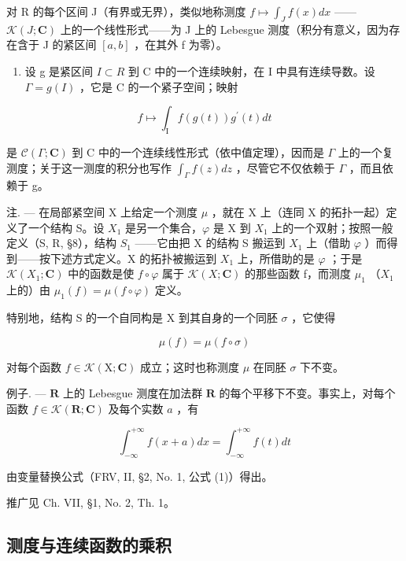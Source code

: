 对 R 的每个区间 J（有界或无界），类似地称测度 \(f \mapsto \int_{J} f(x) dx\) ——\(\mathcal{K}(J; \mathbf{C})\) 上的一个线性形式——为 J 上的 Lebesgue 测度（积分有意义，因为存在含于 J 的紧区间 \([a, b]\) ，在其外 f 为零）。

\begin{enumerate}
\def\labelenumi{\Roman{enumi}.}
\setcounter{enumi}{2}
\tightlist
\item
  设 g 是紧区间 \(I \subset R\) 到 C 中的一个连续映射，在 I 中具有连续导数。设 \(\Gamma = g(I)\) ，它是 C 的一个紧子空间；映射
\end{enumerate}

\[
f \mapsto \int_ {\mathrm{I}} f (g (t)) g ^ {\prime} (t) d t
\]

是 \(\mathcal{C}(\Gamma;\mathbf{C})\) 到 C 中的一个连续线性形式（依中值定理），因而是 \(\Gamma\) 上的一个复测度；关于这一测度的积分也写作 \(\int_{\Gamma} f(z) dz\) ，尽管它不仅依赖于 \(\Gamma\) ，而且依赖于 g。

注. --- 在局部紧空间 X 上给定一个测度 \(\mu\) ，就在 X 上（连同 X 的拓扑一起）定义了一个结构 S。设 \(X_{1}\) 是另一个集合，\(\varphi\) 是 X 到 \(X_{1}\) 上的一个双射；按照一般定义（S, R, §8），结构 \(S_{1}\) ——它由把 X 的结构 S 搬运到 \(X_{1}\) 上（借助 \(\varphi\) ）而得到——按下述方式定义。X 的拓扑被搬运到 \(X_{1}\) 上，所借助的是 \(\varphi\) ；于是 \(\mathcal{K}(X_{1};\mathbf{C})\) 中的函数是使 \(f \circ \varphi\) 属于 \(\mathcal{K}(X;\mathbf{C})\) 的那些函数 f，而测度 \(\mu_{1}\) （\(X_{1}\) 上的）由 \(\mu_{1}(f) = \mu(f \circ \varphi)\) 定义。

特别地，结构 S 的一个自同构是 X 到其自身的一个同胚 \(\sigma\) ，它使得

\[
\mu (f) = \mu (f \circ \sigma)
\]

对每个函数 \(f \in \mathcal{K}(\mathrm{X};\mathbf{C})\) 成立；这时也称测度 \(\mu\) 在同胚 \(\sigma\) 下不变。

例子. --- \(\mathbf{R}\) 上的 Lebesgue 测度在加法群 \(\mathbf{R}\) 的每个平移下不变。事实上，对每个函数 \(f \in \mathcal{K}(\mathbf{R}; \mathbf{C})\) 及每个实数 \(a\) ，有

\[
\int_ {- \infty} ^ {+ \infty} f (x + a) d x = \int_ {- \infty} ^ {+ \infty} f (t) d t
\]

由变量替换公式（FRV, II, §2, No. 1, 公式 (1)）得出。

推广见 Ch. VII, §1, No. 2, Th. 1。

\subsection{测度与连续函数的乘积}

